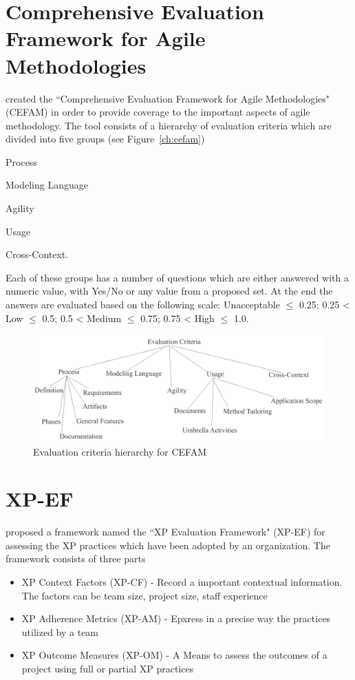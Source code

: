 \section{Comprehensive Evaluation Framework for Agile Methodologies}
\citet{cefam} created the ``Comprehensive Evaluation Framework for Agile Methodologies" (CEFAM) in order to provide coverage to the important aspects of agile methodology. The tool consists of a hierarchy of evaluation criteria which are divided into five groups (see Figure~\ref{ch:cefam})
\begin{inparaenum} [a\upshape)]
\item Process
\item Modeling Language
\item Agility
\item Usage
\item Cross-Context.
\end{inparaenum}
Each of these groups has a number of questions which are either answered with a numeric value, with Yes/No or any value from a proposed set. At the end the answers are evaluated based on the following scale: Unacceptable $\leq$ 0.25; 0.25 < Low $\leq$ 0.5; 0.5 < Medium $\leq$ 0.75; 0.75 < High $\leq$ 1.0.

\begin{figure} [H]
\centerline{\includegraphics[scale=0.75]{include/relatedwork/fig/cefam.pdf}}
\caption{Evaluation criteria hierarchy for CEFAM} 
\label{cefam}
\end{figure}

\section{XP-EF}

\citet{williams2004toward} proposed a framework named the ``XP Evaluation Framework" (XP-EF) for assessing the XP practices which have been adopted by an organization. The framework consists of three parts
\begin{itemize}
\item XP Context Factors (XP-CF) - Record a important contextual information. The factors can be team size, project size, staff experience
\item XP Adherence Metrics (XP-AM) - Epxress in a precise way the practices utilized by a team
\item XP Outcome Measures (XP-OM) - A Means to assess the outcomes of a project using full or partial XP practices
\end{itemize}

